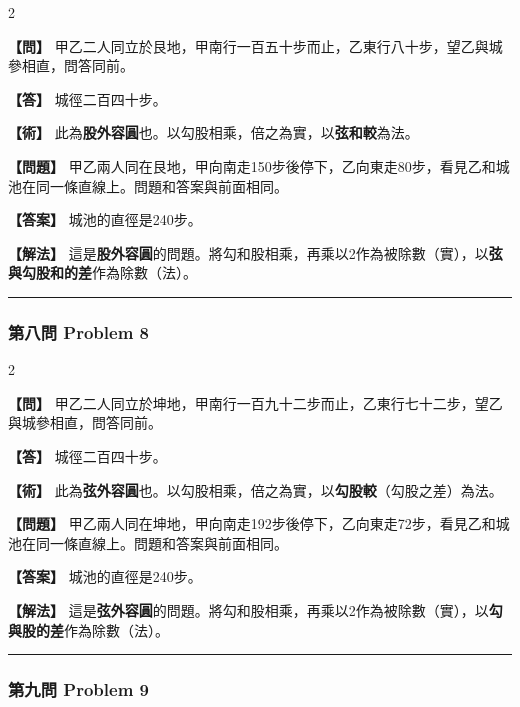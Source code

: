 \documentclass[11pt,a4paper]{article}
\newcommand{\wen}[1]{\par\noindent\textbf{\color{problemcolor}【問】} #1\par}
\newcommand{\da}[1]{\par\noindent\textbf{\color{problemcolor}【答】} #1\par}
\newcommand{\shu}[1]{\par\noindent\textbf{\color{problemcolor}【術】} #1\par}
\newcommand{\wenm}[1]{\par\noindent\textbf{\color{problemcolor}【問題】} #1\par}
\newcommand{\dam}[1]{\par\noindent\textbf{\color{problemcolor}【答案】} #1\par}
\newcommand{\shum}[1]{\par\noindent\textbf{\color{problemcolor}【解法】} #1\par}
\begin{document}
\begin{paracol}{2}
\wen{甲乙二人同立於艮地，甲南行一百五十步而止，乙東行八十步，望乙與城參相直，問答同前。}

\da{城徑二百四十步。}

\shu{此為\textbf{股外容圓}也。以勾股相乘，倍之為實，以\textbf{弦和較}為法。}

\switchcolumn
\wenm{甲乙兩人同在艮地，甲向南走150步後停下，乙向東走80步，看見乙和城池在同一條直線上。問題和答案與前面相同。}

\dam{城池的直徑是240步。}

\shum{這是\textbf{股外容圓}的問題。將勾和股相乘，再乘以2作為被除數（實），以\textbf{弦與勾股和的差}作為除數（法）。}
\end{paracol}

\vspace{0.5cm}
\noindent\textcolor{rulecolor}{\rule{\textwidth}{0.4pt}}

\subsubsection*{第八問 \quad Problem 8}

\begin{paracol}{2}
\wen{甲乙二人同立於坤地，甲南行一百九十二步而止，乙東行七十二步，望乙與城參相直，問答同前。}

\da{城徑二百四十步。}

\shu{此為\textbf{弦外容圓}也。以勾股相乘，倍之為實，以\textbf{勾股較}（勾股之差）為法。}

\switchcolumn
\wenm{甲乙兩人同在坤地，甲向南走192步後停下，乙向東走72步，看見乙和城池在同一條直線上。問題和答案與前面相同。}

\dam{城池的直徑是240步。}

\shum{這是\textbf{弦外容圓}的問題。將勾和股相乘，再乘以2作為被除數（實），以\textbf{勾與股的差}作為除數（法）。}
\end{paracol}

\vspace{0.5cm}
\noindent\textcolor{rulecolor}{\rule{\textwidth}{0.4pt}}

\subsubsection*{第九問 \quad Problem 9}
\end{document}
